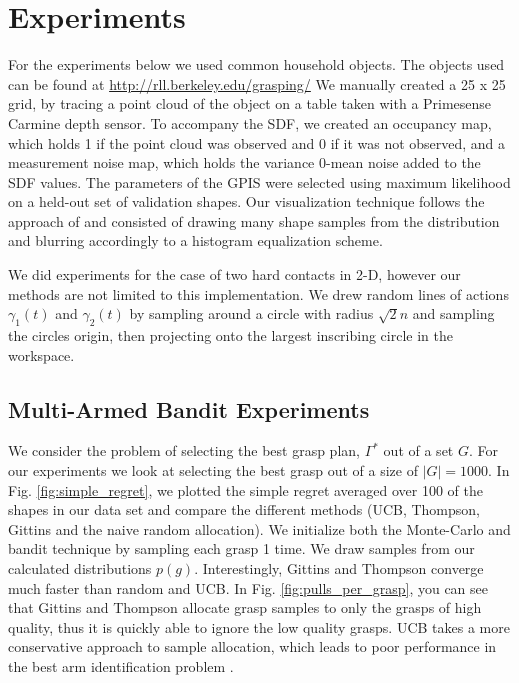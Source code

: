 \documentclass[letterpaper, 10 pt, conference]{ieeeconf}  %
\begin{document}
\section{Experiments}
For the experiments below we used common household objects.  The objects used can be found at \url{http://rll.berkeley.edu/grasping/} We manually created a 25 x 25 grid, by tracing a point cloud of the object on a table taken with a Primesense Carmine depth sensor. To accompany the SDF, we created an occupancy map, which holds 1 if the point cloud was observed and 0 if it was not observed, and a measurement noise map, which holds the variance 0-mean noise added to the SDF values. The parameters of the GPIS were selected using maximum likelihood on a held-out set of validation shapes. Our visualization technique follows the approach of \cite{mahler2015opt} and consisted of drawing many shape samples from the distribution and blurring accordingly to a histogram equalization scheme. 

We did experiments for the case of two hard contacts in 2-D, however our methods are not limited to this implementation. We drew random lines of actions $\gamma_1(t)$ and $\gamma_2(t)$ by sampling around a circle with radius $\sqrt{2}n$ and sampling the circles origin, then projecting onto the largest inscribing circle in the workspace. 





\subsection{Multi-Armed Bandit Experiments}
We consider the problem of selecting the best grasp plan, $\Gamma^*$ out of a set $G$. For our experiments we look at selecting the best grasp out of a size of $|G| = 1000$. In Fig. \ref{fig:simple_regret}, we plotted the simple regret averaged over 100 of the shapes in our data set and compare the different methods (UCB, Thompson, Gittins and the naive random allocation). We initialize both the Monte-Carlo and bandit technique by sampling each grasp 1 time. We draw samples from our calculated distributions $p(g)$.  Interestingly, Gittins and Thompson converge much faster than random and UCB. In Fig. \ref{fig:pulls_per_grasp}, you can see that Gittins and Thompson allocate grasp samples to only the grasps of high quality, thus it is quickly able to ignore the low quality grasps. UCB takes a more conservative approach to sample allocation, which leads to poor performance in the best arm identification problem \cite{bubeck2009pure}.
\end{document}
